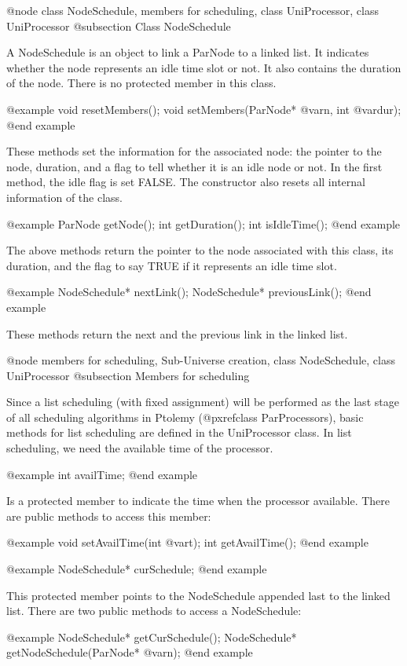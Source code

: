 @node class NodeSchedule, members for scheduling, class UniProcessor, class UniProcessor
@subsection Class NodeSchedule

A NodeSchedule is an object to link a ParNode to a linked list.
It indicates whether the node represents an idle time slot or not.
It also contains the duration of the node. There is no protected member
in this class.

@example
void resetMembers();
void setMembers(ParNode* @var{n}, int @var{dur});
@end example

These methods set the information for the associated node: the pointer to
the node, duration, and a flag to tell whether it is an idle node or not. 
In the first method, the idle flag is set FALSE. The constructor also 
resets all internal information of the class.

@example
ParNode getNode();
int getDuration();
int isIdleTime();
@end example

The above methods return the pointer to the node associated with this class,
its duration, and the flag to say TRUE if it represents an idle time slot.

@example
NodeSchedule* nextLink();
NodeSchedule* previousLink();
@end example

These methods return the next and the previous link in the linked list.

@node members for scheduling, Sub-Universe creation, class NodeSchedule, class UniProcessor
@subsection Members for scheduling

Since a list scheduling (with fixed assignment) will be performed as the 
last stage of all scheduling algorithms in Ptolemy 
(@pxref{class ParProcessors}), basic methods for list scheduling are
defined in the UniProcessor class. In list scheduling, we need the
available time of the processor.

@example
int availTime;
@end example

Is a protected member to indicate the time when the processor available.
There are public methods to access this member:

@example
void setAvailTime(int @var{t});
int getAvailTime();
@end example

@example
NodeSchedule* curSchedule;
@end example

This protected member points to the NodeSchedule appended last to the
linked list. There are two public methods to access a NodeSchedule:

@example
NodeSchedule* getCurSchedule();
NodeSchedule* getNodeSchedule(ParNode* @var{n});
@end example

